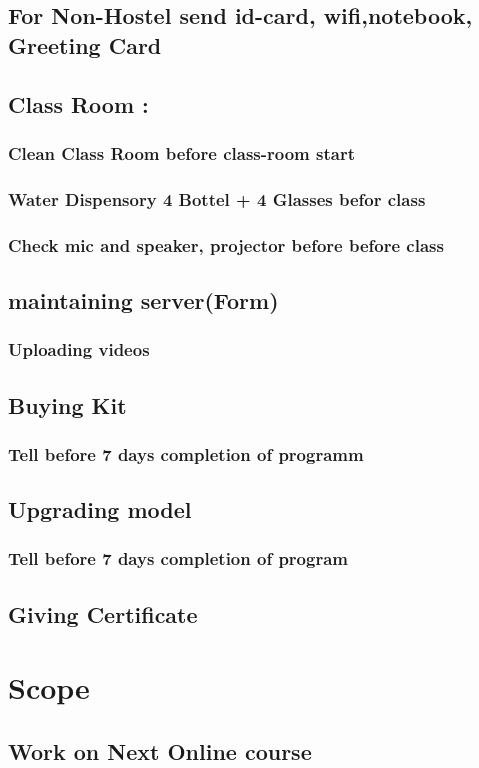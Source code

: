 \documentclass[11pt]{article}
\begin{document}
\subsection{For Non-Hostel send  id-card, wifi,notebook, Greeting Card}
\label{sec:orgb23b984}
\subsection{Class Room :}
\label{sec:orgc78d704}
\subsubsection{Clean Class Room before class-room start}
\label{sec:org383c170}
\subsubsection{Water Dispensory 4 Bottel + 4 Glasses befor class}
\label{sec:orgb792a7f}
\subsubsection{Check mic and speaker, projector before before class}
\label{sec:org1e634a5}
\subsection{maintaining server(Form)}
\label{sec:org138a875}
\subsubsection{Uploading videos}
\label{sec:org090821d}

\subsection{Buying Kit}
\label{sec:orgcf8de18}
\subsubsection{Tell before 7 days completion of programm}
\label{sec:org580c24f}
\subsection{Upgrading model}
\label{sec:org0dcfa81}
\subsubsection{Tell before 7 days completion of program}
\label{sec:orgacd001f}
\subsection{Giving Certificate}
\label{sec:org4d771bc}
\section{Scope}
\label{sec:orgcdaf45c}
\subsection{Work on Next Online course}
\label{sec:orgd71e539}
\end{document}
